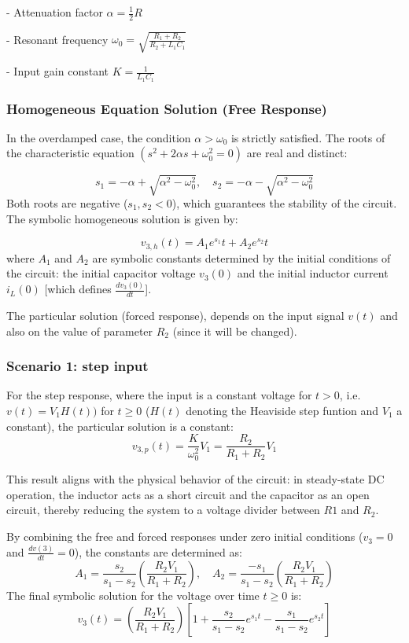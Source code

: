 \documentclass[11pt, a4paper]{article}
\begin{document}
- Attenuation factor $\alpha = \frac{1}{2} R$

- Resonant frequency $\omega_0 =\sqrt{\frac{R_1 +R_2}{R_2+L_1 C_1}}$

- Input gain constant $K = \frac{1}{L_1 C_1}$

\subsubsection*{Homogeneous Equation Solution (Free Response)}
In the overdamped case, the condition $\alpha > \omega_0$ is strictly satisfied. The  roots of the characteristic equation $(s^2 + 2\alpha s + \omega_0^2 = 0)$ are real and distinct:

\[
s_1 = -\alpha +\sqrt{\alpha^2-\omega_0^2}, \quad
s_2 = -\alpha -\sqrt{\alpha^2-\omega_0^2}
\]
Both roots are negative ($s_1 , s_2 < 0$), which guarantees the stability of the circuit. The symbolic homogeneous solution is given by:

\[
v_{3,h} (t) = A_1 e^{s_1} t + A_2 e^{s_2} t
\]
where $A_1$ and $A_2$ are symbolic constants determined by the initial conditions of the circuit: the initial capacitor voltage $v_3(0)$ and the initial inductor current $i_L (0)$ [which defines $\frac{dv_3(0)}{dt}$].

The particular solution (forced response), depends on the input signal $v(t)$ and also on the value of parameter $R_2$ (since it will be changed).

\subsubsection*{Scenario 1: step input}
For the step response, where the input is a constant voltage for $t > 0$, i.e. $v(t) = V_1 H(t))$ for $t \ge 0$ ($H(t)$ denoting the Heaviside step funtion and $V_1$ a constant), the particular
solution is a constant:
\[
v_{3,p} (t) = \frac{K}{\omega_0^2} V_1 =\frac{R_2}{R_1 + R_2} V_1
\]

This result aligns with the physical behavior of the circuit: in steady-state DC operation, the inductor acts as a short circuit and the capacitor as an open circuit, thereby reducing the system to a voltage divider between $R1$ and $R_2$.

By combining the free and forced responses under zero initial conditions ($v_3=0$ and $\frac{dv(3)}{dt}=0$), the constants are determined as:
\[
A_1 = \frac{s_2}{s_1-s_2} \left(\frac{R_2V_1}{R_1 + R_2}\right), \quad
A_2 = \frac{-s_1}{s_1-s_2} \left(\frac{R_2V_1}{R_1 + R_2}\right)
\]
The final symbolic solution for the voltage over time $t\ge 0$ is:
\[
v_3 (t) =\left(\frac{R_2V_1}{R_1 + R_2}\right)
\left[1+\frac{s_2}{s_1-s_2}e^{s_1t}  -\frac{ s_1}{s_1-s_2}e^{s_2t} \right]
\]
\end{document}
